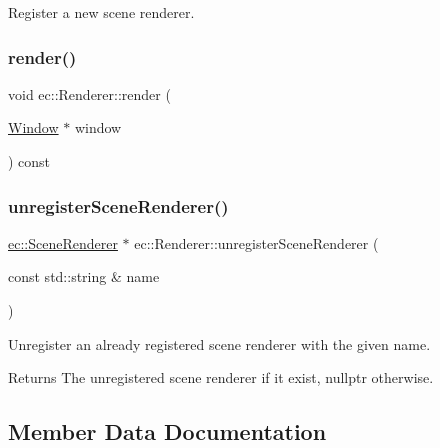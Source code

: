 Register a new scene renderer. \mbox{\label{classec_1_1_renderer_aecc57f271196b00c4ec3cae7ad5317ae}} 
\subsubsection{\texorpdfstring{render()}{render()}}
{\footnotesize\ttfamily void ec\+::\+Renderer\+::render (\begin{DoxyParamCaption}\item[{\mbox{\hyperlink{classec_1_1_window}{Window}} $\ast$}]{window }\end{DoxyParamCaption}) const}

\mbox{\label{classec_1_1_renderer_a5c853ee4c34b069cc8142db8409abac6}} 
\subsubsection{\texorpdfstring{unregister\+Scene\+Renderer()}{unregisterSceneRenderer()}}
{\footnotesize\ttfamily \mbox{\hyperlink{classec_1_1_scene_renderer}{ec\+::\+Scene\+Renderer}} $\ast$ ec\+::\+Renderer\+::unregister\+Scene\+Renderer (\begin{DoxyParamCaption}\item[{const std\+::string \&}]{name }\end{DoxyParamCaption})}

Unregister an already registered scene renderer with the given name. \begin{DoxyReturn}{Returns}
The unregistered scene renderer if it exist, nullptr otherwise. 
\end{DoxyReturn}


\subsection{Member Data Documentation}
\mbox{\label{classec_1_1_renderer_a00afed952025d62a654a5f961a55b342}} 
